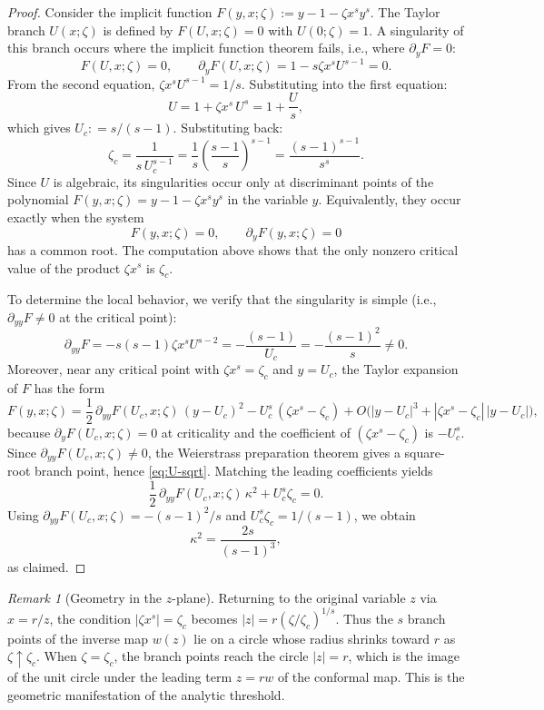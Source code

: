 \documentclass[11pt]{amsart}
\numberwithin{equation}{section}
\theoremstyle{plain}
\theoremstyle{definition}
\theoremstyle{remark}
\newtheorem{remark}[theorem]{Remark}
\begin{document}
\begin{proof}
	Consider the implicit function $F(y,x;\zeta) := y - 1 - \zeta x^s y^s$. The Taylor branch
	$U(x;\zeta)$ is defined by $F(U,x;\zeta) = 0$ with $U(0;\zeta) = 1$.
	A singularity of this branch occurs where the implicit function theorem fails,
	i.e., where $\partial_y F = 0$:
	\[
		F(U,x;\zeta) = 0, \qquad \partial_y F(U,x;\zeta) = 1 - s\zeta x^s U^{s-1} = 0.
	\]
	From the second equation, $\zeta x^s U^{s-1} = 1/s$. Substituting into the
	first equation:
	\[
		U = 1 + \zeta x^s\,U^s = 1 + \frac{U}{s},
	\]
	which gives $U_c : = s/(s-1)$. Substituting back:
	\[
		\zeta_c = \frac{1}{s\,U_c^{s-1}}
		= \frac{1}{s} \left(\frac{s-1}{s}\right)^{s-1}
		= \frac{(s-1)^{s-1}}{s^s}.
	\]
	Since $U$ is algebraic, its singularities occur only at discriminant points
	of the polynomial $F(y,x;\zeta)=y-1-\zeta x^s y^s$ in the variable $y$.
	Equivalently, they occur exactly when the system
	\[
		F(y,x;\zeta)=0,
		\qquad
		\partial_yF(y,x;\zeta)=0
	\]
	has a common root. The computation above shows that the only nonzero
	critical value of the product $\zeta x^s$ is $\zeta_c$.

	To determine the local behavior, we verify that the singularity is simple
	(i.e., $\partial_{yy} F \neq 0$ at the critical point):
	\[
		\partial_{yy} F = -s(s-1)\zeta x^s U^{s-2}
		= -\frac{(s-1)}{U_c} = -\frac{(s-1)^2}{s} \neq 0.
	\]
	Moreover, near any critical point with $\zeta x^s=\zeta_c$ and $y=U_c$, the
	Taylor expansion of $F$ has the form
	\[
		F(y,x;\zeta)
		=
		\frac12\,\partial_{yy}F(U_c,x;\zeta)\,(y-U_c)^2
		- U_c^s\,(\zeta x^s-\zeta_c)
		+ O\!\bigl(|y-U_c|^3 + |\zeta x^s-\zeta_c|\,|y-U_c|\bigr),
	\]
	because $\partial_yF(U_c,x;\zeta)=0$ at criticality and the coefficient of
	$(\zeta x^s-\zeta_c)$ is $-U_c^s$. Since
	$\partial_{yy}F(U_c,x;\zeta)\neq0$, the Weierstrass preparation theorem gives
	a square-root branch point, hence \eqref{eq:U-sqrt}. Matching the leading
	coefficients yields
	\[
		\frac12\,\partial_{yy}F(U_c,x;\zeta)\,\kappa^2
		+
		U_c^s\zeta_c
		=
		0.
	\]
	Using $\partial_{yy}F(U_c,x;\zeta)=-(s-1)^2/s$ and
	$U_c^s\zeta_c=1/(s-1)$, we obtain
	\[
		\kappa^2=\frac{2s}{(s-1)^3},
	\]
	as claimed.
\end{proof}

\begin{remark}[Geometry in the $z$-plane]
	\label{rem:z-plane}
	Returning to the original variable $z$ via $x = r/z$, the condition
	$|\zeta x^s| = \zeta_c$ becomes $|z| = r(\zeta/\zeta_c)^{1/s}$. Thus the $s$ branch
	points of the inverse map $w(z)$ lie on a circle whose radius shrinks toward $r$
	as $\zeta \uparrow \zeta_c$. When $\zeta = \zeta_c$, the branch points reach
	the circle $|z| = r$, which is the image of the unit circle under the leading
	term $z = rw$ of the conformal map. This is the geometric manifestation of the
	analytic threshold.
\end{remark}
\end{document}
